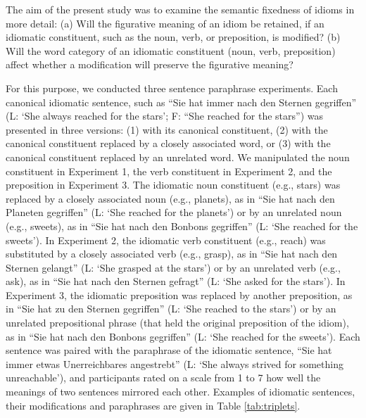 \documentclass[output=paper]{langsci/langscibook}
\begin{document}
The aim of the present study was to examine the semantic fixedness of idioms in more detail: (a) Will the figurative meaning of an idiom be retained, if an idiomatic constituent, such as the noun, verb, or preposition, is modified?  (b) Will the word category of an idiomatic constituent (noun, verb, preposition) affect whether a modification will preserve the figurative meaning? 

For this purpose, we conducted three sentence paraphrase experiments. Each canonical idiomatic sentence, such as “Sie hat immer nach den Sternen gegriffen” (L: ‘She always reached for the stars’; F: “She reached for the stars”) was presented in three versions: (1) with its canonical constituent, (2) with the canonical constituent replaced by a closely associated word, or (3) with the canonical constituent replaced by an unrelated word. We manipulated the noun constituent in Experiment 1, the verb constituent in Experiment 2, and the preposition in Experiment 3. The idiomatic noun constituent (e.g., stars) was replaced by a closely associated noun (e.g., planets), as in “Sie hat nach den Planeten gegriffen” (L: ‘She reached for the planets’) or by an unrelated noun (e.g., sweets), as in “Sie hat nach den Bonbons gegriffen” (L: ‘She reached for the sweets’). In Experiment 2, the idiomatic verb constituent (e.g., reach) was substituted by a closely associated verb (e.g., grasp), as in “Sie hat nach den Sternen gelangt” (L: ‘She grasped at the stars’) or by an unrelated verb (e.g., ask), as in “Sie hat nach den Sternen gefragt” (L: ‘She asked for the stars’). In Experiment 3, the idiomatic preposition was replaced by another preposition, as in “Sie hat zu den Sternen gegriffen” (L: ‘She reached to the stars’) or by an unrelated prepositional phrase (that held the original preposition of the idiom), as in “Sie hat nach den Bonbons gegriffen” (L: ‘She reached for the sweets’).  Each sentence was paired with the paraphrase of the idiomatic sentence, “Sie hat immer etwas Unerreichbares angestrebt” (L: ‘She always strived for something unreachable’), and participants rated on a scale from 1 to 7 how well the meanings of two sentences mirrored each other. Examples of idiomatic sentences, their modifications and paraphrases are given in Table \ref{tab:triplets}.
\end{document}
